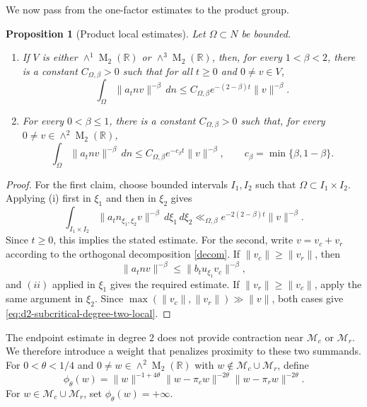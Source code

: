 \documentclass[reqno,11pt]{amsart}
\newtheorem{prop}[prop]{Proposition}
\theoremstyle{definition}
\theoremstyle{remark}
\numberwithin{equation}{section}
\newcommand{\M}{\operatorname{M}}
\begin{document}
We now pass from the one-factor estimates to the product group.

\begin{prop}[Product local estimates]
\label{prop:product-local-d2}
Let $\Omega\subset N$ be bounded.
\begin{enumerate}[label=\textnormal{(\roman*)}]
\item
If $V$ is either $\wedge^1\M_2(\mathbb R)$ or
$\wedge^3\M_2(\mathbb R)$, then, for every $1<\beta<2$, there is a
constant $C_{\Omega,\beta}>0$ such that for all $t\ge0$ and $0\ne v\in V$,
$$
\int_\Omega\|a_tnv\|^{-\beta}\,dn
\le
C_{\Omega,\beta}e^{-(2-\beta)t}\|v\|^{-\beta}.
$$


\item
For every $0<\beta\le1$, there is a constant
$C_{\Omega,\beta}>0$ such that, for every
$0\ne v\in\wedge^2\M_2(\mathbb R)$,
\begin{equation}\label{eq:d2-subcritical-degree-two-local}
\int_\Omega\|a_tnv\|^{-\beta}\,dn
\le
C_{\Omega,\beta}e^{-c_\beta t}\|v\|^{-\beta},
\qquad
c_\beta=\min\{\beta,1-\beta\}.
\end{equation}
\end{enumerate}
\end{prop}

\begin{proof}
For the first claim, choose bounded intervals $I_1,I_2$ such that
$\Omega\subset I_1\times I_2$. Applying
\textnormal{(i)} first in $\xi_1$ and
then in $\xi_2$ gives
$$
\int_{I_1\times I_2}
\|a_tn_{\xi_1,\xi_2}v\|^{-\beta}\,d\xi_1\,d\xi_2
\ll_{\Omega,\beta}
e^{-2(2-\beta)t}\|v\|^{-\beta}.
$$
Since $t\ge0$, this implies the stated estimate.
 For the second, write $v=v_c+v_r$ according to the orthogonal decomposition \eqref{decom}. If $\|v_c\|\ge\|v_r\|$, then
$$
\|a_tn v\|^{-\beta}\le \|b_tu_{\xi_1}v_c\|^{-\beta},
$$
and $(ii)$ applied in $\xi_1$ gives the required estimate. If $\|v_r\|\ge\|v_c\|$, apply the same argument in $\xi_2$. Since $\max(\|v_c\|,\|v_r\|)\gg\|v\|$, both cases give \eqref{eq:d2-subcritical-degree-two-local}.
\end{proof}

The endpoint estimate in degree $2$ does not provide contraction near
$\mathcal M_c$ or $\mathcal M_r$. We therefore introduce a weight that
penalizes proximity to these two summands. For $0<\theta<1/4$ and
$0\ne w\in\wedge^2\M_2(\mathbb R)$ with
$w\notin\mathcal M_c\cup\mathcal M_r$, define
\begin{equation}\label{eq:d2-local-weight}
\phi_\theta(w)
=
\|w\|^{-1+4\theta}
\|w-\pi_cw\|^{-2\theta}
\|w-\pi_rw\|^{-2\theta}.
\end{equation}
For $w\in\mathcal M_c\cup\mathcal M_r$, set
$\phi_\theta(w)=+\infty$. 
\end{document}
